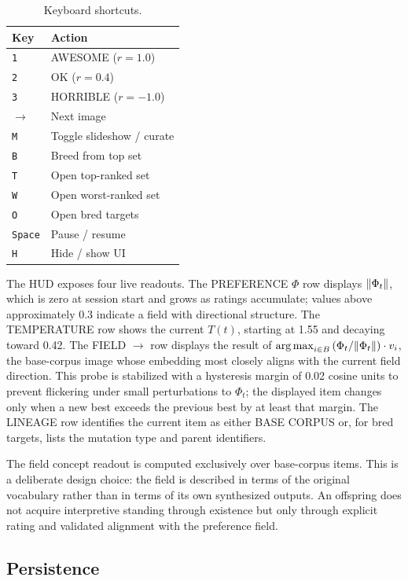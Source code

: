 \documentclass[12pt, a4paper]{article}
\DeclareMathOperator*{\argmax}{arg\,max}
\DeclarePairedDelimiter{\norm}{\lVert}{\rVert}
\theoremstyle{definition}
\begin{document}
\begin{table}[H]
\centering
\begin{tabular}{ll}
\toprule
\textbf{Key} & \textbf{Action} \\
\midrule
\texttt{1} & AWESOME ($r = 1.0$) \\
\texttt{2} & OK ($r = 0.4$) \\
\texttt{3} & HORRIBLE ($r = -1.0$) \\
\texttt{$\rightarrow$} & Next image \\
\texttt{M} & Toggle slideshow / curate \\
\texttt{B} & Breed from top set \\
\texttt{T} & Open top-ranked set \\
\texttt{W} & Open worst-ranked set \\
\texttt{O} & Open bred targets \\
\texttt{Space} & Pause / resume \\
\texttt{H} & Hide / show UI \\
\bottomrule
\end{tabular}
\caption{Keyboard shortcuts.}
\end{table}

The HUD exposes four live readouts. The PREFERENCE $\Phi$ row displays $\norm{\Phi_t}$, which is zero at session start and grows as ratings accumulate; values above approximately 0.3 indicate a field with directional structure. The TEMPERATURE row shows the current $T(t)$, starting at 1.55 and decaying toward 0.42. The FIELD $\to$ row displays the result of $\argmax_{i \in B}\,(\Phi_t / \norm{\Phi_t}) \cdot v_i$, the base-corpus image whose embedding most closely aligns with the current field direction. This probe is stabilized with a hysteresis margin of 0.02 cosine units to prevent flickering under small perturbations to $\Phi_t$; the displayed item changes only when a new best exceeds the previous best by at least that margin. The LINEAGE row identifies the current item as either BASE CORPUS or, for bred targets, lists the mutation type and parent identifiers.

The field concept readout is computed exclusively over base-corpus items. This is a deliberate design choice: the field is described in terms of the original vocabulary rather than in terms of its own synthesized outputs. An offspring does not acquire interpretive standing through existence but only through explicit rating and validated alignment with the preference field.

\subsection{Persistence}
\end{document}

